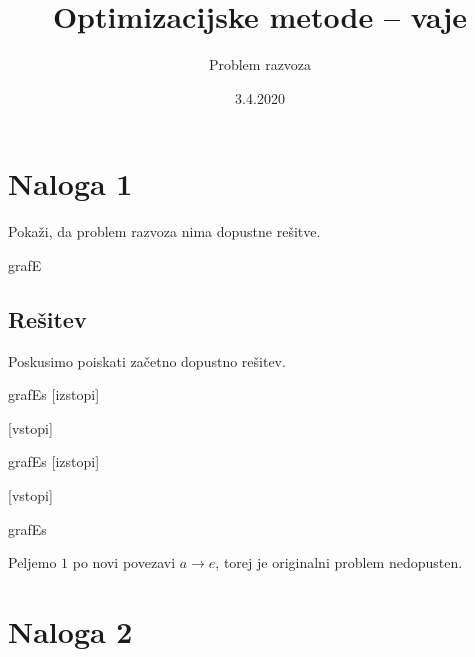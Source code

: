\documentclass[14pt]{extarticle}
\title{Optimizacijske metode -- vaje}
\author{Problem razvoza}
\date{3.4.2020}
\begin{document}
\maketitle

\section*{Naloga 1}

Pokaži, da problem razvoza nima dopustne rešitve.

\begin{razvoz}{grafE}
\end{razvoz}

\clearpage

\subsection*{Rešitev}

Poskusimo poiskati začetno dopustno rešitev.

\begin{razvoz}{grafEs}
    [izstopi]


    [vstopi]
\end{razvoz}

\begin{razvoz}{grafEs}
    [izstopi]


    [vstopi]
\end{razvoz}

\begin{razvoz}{grafEs}

\end{razvoz}

Peljemo $1$ po novi povezavi $a \to e$, torej je originalni problem nedopusten.

\clearpage

\section*{Naloga 2}
\end{document}
